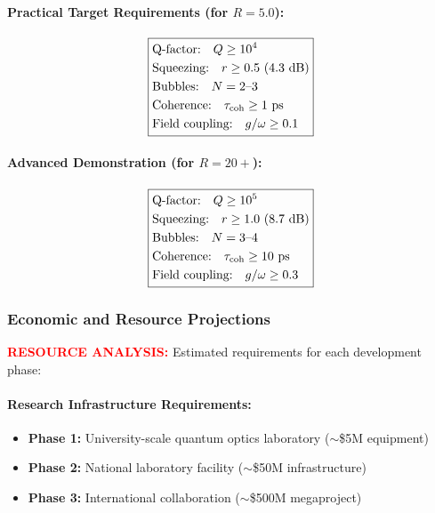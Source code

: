 \documentclass[11pt]{article}
\begin{document}
{\paragraph{Practical Target Requirements (for $R = 5.0$):}
\begin{align*}
\boxed{
\begin{aligned}
&\text{Q-factor:} \quad Q \geq 10^4 \\
&\text{Squeezing:} \quad r \geq 0.5 \text{ (4.3 dB)} \\
&\text{Bubbles:} \quad N = 2\text{--}3 \\
&\text{Coherence:} \quad \tau_{\rm coh} \geq 1\text{ ps} \\
&\text{Field coupling:} \quad g/\omega \geq 0.1
\end{aligned}
}
\end{align*}

\paragraph{Advanced Demonstration (for $R = 20+$):}
\begin{align*}
\boxed{
\begin{aligned}
&\text{Q-factor:} \quad Q \geq 10^5 \\
&\text{Squeezing:} \quad r \geq 1.0 \text{ (8.7 dB)} \\
&\text{Bubbles:} \quad N = 3\text{--}4 \\
&\text{Coherence:} \quad \tau_{\rm coh} \geq 10\text{ ps} \\
&\text{Field coupling:} \quad g/\omega \geq 0.3
\end{aligned}
}
\end{align*}

\subsubsection*{Economic and Resource Projections}
\textcolor{red}{\textbf{RESOURCE ANALYSIS:}} Estimated requirements for each development phase:

\paragraph{Research Infrastructure Requirements:}
\begin{itemize}
  \item \textbf{Phase 1:} University-scale quantum optics laboratory ($\sim$\$5M equipment)
  \item \textbf{Phase 2:} National laboratory facility ($\sim$\$50M infrastructure)
  \item \textbf{Phase 3:} International collaboration ($\sim$\$500M megaproject)
\end{itemize}

}
\end{document}
